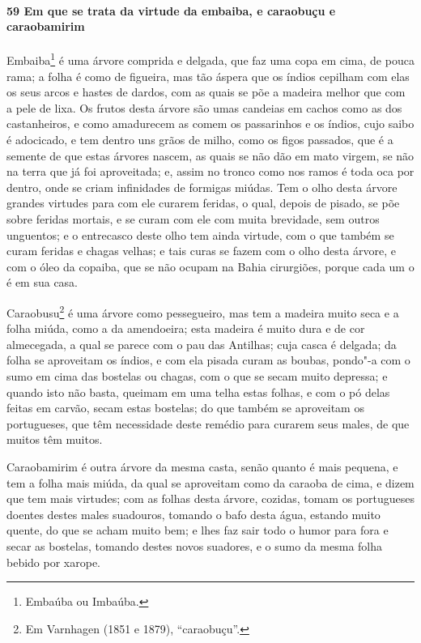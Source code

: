 \paragraph{59 Em que se trata da virtude da embaiba, e caraobuçu e caraobamirim}

Embaiba\footnote{ Embaúba ou Imbaúba.} é uma árvore comprida e delgada, que faz uma copa
em cima, de pouca rama; a folha é como de figueira, mas tão áspera que os índios cepilham
com elas os seus arcos e hastes de dardos, com as quais se põe a madeira melhor que com a
pele de lixa. Os frutos desta árvore são umas candeias em cachos como as dos castanheiros,
e como amadurecem as comem os passarinhos e os índios, cujo saibo é adocicado, e tem
dentro uns grãos de milho, como os figos passados, que é a semente de que estas árvores
nascem, as quais se não dão em mato virgem, se não na terra que já foi aproveitada; e,
assim no tronco como nos ramos é toda oca por dentro, onde se criam infinidades de
formigas miúdas. Tem o olho desta árvore grandes virtudes para com ele curarem feridas, o
qual, depois de pisado, se põe sobre feridas mortais, e se curam com ele com muita
brevidade, sem outros unguentos; e o entrecasco deste olho tem ainda virtude, com o que
também se curam feridas e chagas velhas; e tais curas se fazem com o olho desta árvore, e
com o óleo da copaiba, que se não ocupam na Bahia cirurgiões, porque cada um o é em sua
casa.

Caraobusu\footnote{ Em Varnhagen (1851 e 1879), ``caraobuçu''.} é uma árvore como
pessegueiro, mas tem a madeira muito seca e a folha miúda, como a da amendoeira; esta
madeira é muito dura e de cor almecegada, a qual se parece com o pau das Antilhas; cuja
casca é delgada; da folha se aproveitam os índios, e com ela pisada curam as boubas,
pondo"-a com o sumo em cima das bostelas ou chagas, com o que se secam muito depressa; e
quando isto não basta, queimam em uma telha estas folhas, e com o pó delas feitas em
carvão, secam estas bostelas; do que também se aproveitam os portugueses, que têm
necessidade deste remédio para curarem seus males, de que muitos têm muitos.

Caraobamirim é outra árvore da mesma casta, senão quanto é mais pequena, e tem a folha
mais miúda, da qual se aproveitam como da caraoba de cima, e dizem que tem mais virtudes;
com as folhas desta árvore, cozidas, tomam os portugueses doentes destes males suadouros,
tomando o bafo desta água, estando muito quente, do que se acham muito bem; e lhes faz
sair todo o humor para fora e secar as bostelas, tomando destes novos suadores, e o sumo
da mesma folha bebido por xarope.

